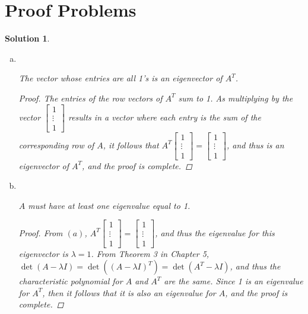 \documentclass[11pt]{scrartcl}
\theoremstyle{dotlessP}
\newtheorem{sol}{Solution}[section]
\theoremstyle{dotlessN}
\begin{document}
\section{Proof Problems}
\begin{sol} \
	\begin{enumerate}[a)]
		\item \
			\begin{claim}
				The vector whose entries are all 1's is an eigenvector of $A^T$.	
			\end{claim}
			\begin{proof}
				The entries of the row vectors of $A^T$ sum to 1. As multiplying by the vector $
\begin{bmatrix}
	1 \\
	\vdots \\
	1
\end{bmatrix}
				$ results in a vector where each entry is the sum of the corresponding row of $A$, it follows that $A^T
\begin{bmatrix}
	1 \\
	\vdots \\
	1
\end{bmatrix} =
\begin{bmatrix}
	1 \\
	\vdots \\
	1
\end{bmatrix}
				$, and thus is an eigenvector of $A^T$, and the proof is complete.
			\end{proof}
		\item \
			\begin{claim}
				$A$ must have at least one eigenvalue equal to 1.
			\end{claim}
			\begin{proof}
				From $(a)$, $A^T
\begin{bmatrix}
	1 \\
	\vdots \\
	1
\end{bmatrix} = 
\begin{bmatrix}
	1 \\
	\vdots \\
	1
\end{bmatrix}
				$, and thus the eigenvalue for this eigenvector is $\lambda = 1$. From Theorem 3 in Chapter 5,  $\det(A - \lambda I) = \det((A - \lambda I)^T) = \det(A^T - \lambda I)$, and thus the characteristic polynomial for  $A$ and $A^T$ are the same. Since 1 is an eigenvalue for $A^T$, then it follows that it is also an eigenvalue for $A$, and the proof is complete.

\end{proof}
\end{enumerate}
\end{sol}
\end{document}
